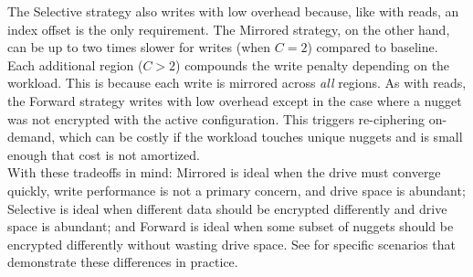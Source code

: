 The Selective strategy also writes with low overhead because, like with reads,
an index offset is the only requirement. The Mirrored strategy, on the other
hand, can be up to two times slower for writes (when $C = 2$) compared to
baseline. Each additional region ($C > 2$) compounds the write penalty depending
on the workload. This is because each write is mirrored across \emph{all}
regions. As with reads, the Forward strategy writes with low overhead except in
the case where a nugget was not encrypted with the active configuration. This
triggers re-ciphering on-demand, which can be costly if the workload touches
unique nuggets and is small enough that cost is not amortized.\\

With these tradeoffs in mind: Mirrored is ideal when the drive must converge
quickly, write performance is not a primary concern, and drive space is
abundant; Selective is ideal when different data should be encrypted differently
and drive space is abundant; and Forward is ideal when some subset of nuggets
should be encrypted differently without wasting drive space. See
 for specific scenarios that demonstrate these differences in
practice.

\fi
